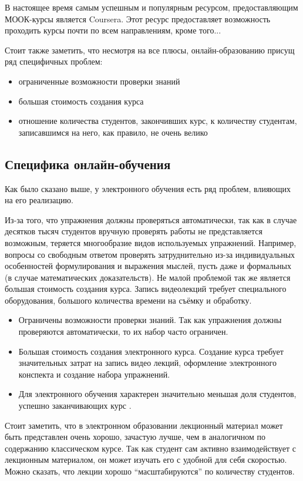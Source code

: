 \documentclass{matmex-diploma-custom}
\begin{document}
В настоящее время самым успешным и популярным ресурсом,
предоставляющим МООК-курсы является Coursera. Этот ресурс
предоставляет возможность проходить курсы почти по всем направлениям,
кроме того...

Стоит также заметить, что несмотря на все плюсы, онлайн-образованию
присущ ряд специфичных проблем:
\begin{itemize}
\item ограниченные возможности проверки знаний
\item большая стоимость создания курса
\item отношение количества студентов, закончивших курс, к количеству
  студентам, записавшимся на него, как правило, не очень велико
\end{itemize}

\subsection*{Специфика онлайн-обучения}
Как было сказано выше, у электронного обучения есть ряд проблем,
влияющих на его реализацию.

Из-за того, что упражнения должны проверяться автоматически, так как в
случае десятков тысяч студентов вручную проверять работы не
представляется возможным, теряется многообразие видов используемых
упражнений. Например, вопросы со свободным ответом проверять
затруднительно из-за индивидуальных особенностей формулирования и
выражения мыслей, пусть даже и формальных (в случае математических
доказательств).
Не малой проблемой так же является большая стоимость создания
курса. Запись видеолекций требует специального оборудования, большого
количества времени на съёмку и обработку.
\begin{itemize}
\item Ограничены возможности проверки знаний. Так как упражнения
  должны проверяются автоматически, то их набор часто ограничен.
\item Большая стоимость создания электронного курса. Создание курса требует
  значительных затрат на запись видео лекций, оформление электронного
  конспекта и создание набора упражнений.
\item Для электронного обучения характерен значительно
  меньшая доля студентов, успешно заканчивающих курс \cite{Clow}.
\end{itemize}

Стоит заметить, что в электронном образовании лекционный материал
может быть представлен очень хорошо, зачастую лучше, чем в аналогичном
по содержанию классическом курсе. Так как студент сам активно
взаимодействует с лекционным материалом, он может изучать его с
удобной для себя скоростью. Можно сказать, что лекции хорошо
``масштабируются'' по количеству студентов.
\end{document}

